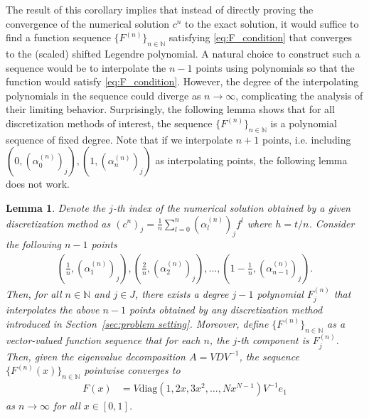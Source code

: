 \documentclass{article}
\newtheorem{lemma}{Lemma}
\theoremstyle{definition}
\newcommand{\pr}[1]{ \left( #1 \right) }
\begin{document}
The result of this corollary implies that instead of directly proving the convergence of the numerical solution $c^n$ to the exact solution, it would suffice to find a function sequence $\{F^{(n)}\}_{n \in \mathbb{N}}$ satisfying \eqref{eq:F_condition} that converges to the (scaled) shifted Legendre polynomial. 
A natural choice to construct such a sequence would be to interpolate the $n-1$ points using polynomials so that the function would satisfy \eqref{eq:F_condition}.
However, the degree of the interpolating polynomials in the sequence could diverge as $n \to \infty$, complicating the analysis of their limiting behavior. 
Surprisingly, the following lemma shows that for all discretization methods of interest, the sequence $\{F^{(n)}\}_{n \in \mathbb{N}}$ is a polynomial sequence of fixed degree. 
Note that if we interpolate $n+1$ points, i.e. including $\pr{0, \pr{\alpha^{(n)}_0}_j}, \pr{1, \pr{\alpha^{(n)}_n}_j}$ as interpolating points, the following lemma does not work. 

\begin{lemma} \label{lem:degree_bound}
    Denote the $j$-th index of the numerical solution obtained by a given discretization method as $\pr{c^n}_j = \frac{1}{n} \sum_{l=0}^n \pr{\alpha^{(n)}_l}_j f^l$ where $h = t/n$. 
    Consider the following $n-1$ points 
    \begin{align} \label{inter_points}
        \pr{\frac{1}{n}, \pr{\alpha^{(n)}_1}_j}, \pr{\frac{2}{n}, \pr{\alpha^{(n)}_2}_j}, \dots, \pr{1 - \frac{1}{n}, \pr{\alpha^{(n)}_{n-1}}_j}.
    \end{align}
    Then, for all $n \in \mathbb{N}$ and $j \in J$, there exists a degree $j-1$ polynomial $F^{(n)}_j$ that interpolates the above $n-1$ points obtained by 
    any discretization method introduced in Section~\ref{sec:problem setting}.
    Moreover, define $\{F^{(n)}\}_{n \in \mathbb{N}}$ as a vector-valued function sequence that for each $n$, the $j$-th component is $F^{(n)}_j$. 
    Then, given the eigenvalue decomposition $A=VDV^{-1}$, the sequence $\{F^{(n)}(x)\}_{n \in \mathbb{N}}$ pointwise converges to 
    \begin{align*}
        F(x) &= V \text{diag} \pr{ 1, 2x, 3x^2, \dots, Nx^{N-1}} V^{-1} e_1
    \end{align*}
    as $n \to \infty$ for all $x \in [0,1]$.
\end{lemma}
\end{document}
